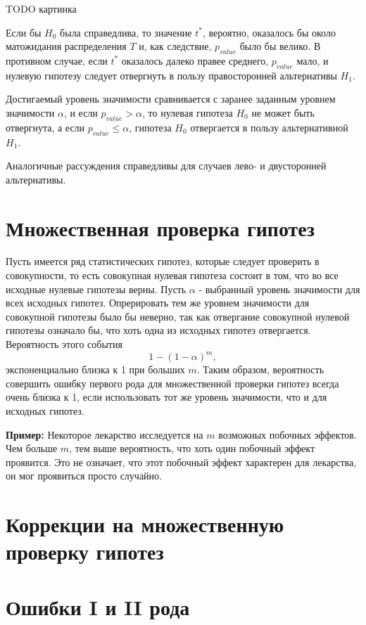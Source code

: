 TODO картинка

Если бы $H_0$ была справедлива, то значение $t^*$, вероятно, оказалось бы около матожидания распределения $T$ и, как следствие, $p_{value}$ было бы велико. В противном случае, если $t^*$ оказалось далеко правее среднего, $p_{value}$ мало, и нулевую гипотезу следует отвергнуть в пользу правосторонней альтернативы $H_1$.

Достигаемый уровень значимости сравнивается с заранее заданным уровнем значимости $\alpha$, и если $p_{value} > \alpha$, то нулевая гипотеза $H_0$ не может быть отвергнута, а если $p_{value} \leqslant \alpha$, гипотеза $H_0$ отвергается в пользу альтернативной $H_1$.

Аналогичные рассуждения справедливы для случаев лево- и двусторонней альтернативы.

\section{Множественная проверка гипотез}

Пусть имеется ряд статистических гипотез, которые следует проверить в совокупности, то есть совокупная нулевая гипотеза состоит в том, что во все исходные нулевые гипотезы верны. Пусть $\alpha$ - выбранный уровень значимости для всех исходных гипотез. Опрерировать тем же уровнем значимости для совокупной гипотезы было бы неверно, так как отвергание совокупной нулевой гипотезы означало бы, что хоть одна из исходных гипотез отвергается. Вероятность этого события
$$
1 - (1 - \alpha)^m,
$$
экспоненциально близка к 1 при больших $m$. Таким образом, вероятность совершить ошибку первого рода для множественной проверки гипотез всегда очень близка к 1, если использовать тот же уровень значимости, что и для исходных гипотез.

\textbf{Пример:} Некоторое лекарство исследуется на $m$ возможных побочных эффектов. Чем больше $m$, тем выше вероятность, что хоть один побочный эффект проявится. Это не означает, что этот побочный эффект характерен для лекарства, он мог проявиться просто случайно.

\section{Коррекции на множественную проверку гипотез}

\section{Ошибки I и II рода}


